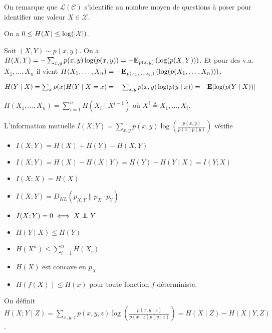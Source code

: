 On remarque que $\mathcal{L}(\mathcal{C})$ s'identifie au nombre moyen de questions à poser pour identifier une valeur $X \in \mathcal{X}$.

\begin{thm}
	On a $0 \leq H(X) \leq \log( \left\lvert\mathcal{X}\right\rvert )$.
\end{thm}

\begin{defn}
	Soit $(X,Y) \sim p(x,y)$.
	On a $H(X,Y) = - \sum_{x,y} p(x,y) \log(p(x,y)) = - \mathbf{E}_{p(x,y)} \left( \log (p(X,Y)) \right)$.
	Et pour des v.a. $X_1, \ldots, X_n$ il vient $H(X_1,\ldots,X_n) = - \mathbf{E}_{p(x_1,\ldots,x_n)} \left( \log( p(X_1,\ldots,X_n)) \right)$.
\end{defn}

\begin{defn}
	$H(Y \mid X)
		= \sum_x p(x) H(Y \mid X = x)
		= - \sum_{x,y} p(x,y) \log(p(y \mid x))
		= - \mathbf{E} [ \log(p(Y \mid X)) ]$
\end{defn}

\begin{thm}
	$H(X_1,\ldots,X_n) = \sum_{i = 1}^n H(X_i \mid X^{i - 1})$ où $X^i \triangleq X_1,\ldots,X_i$.
\end{thm}

\begin{pop}
	L'information mutuelle $I(X;Y) = \sum_{x,y} p(x,y) \log \left( \frac{p(x,y)}{p(x)p(y)} \right)$ vérifie
	\begin{itemize}
		\item[\textbullet] $I(X;Y) = H(X) + H(Y) - H(X,Y)$
		\item[\textbullet] $I(X;Y) = H(X) - H(X \mid Y) = H(Y) - H(Y \mid X) = I(Y;X)$
		\item[\textbullet] $I(X;X) = H(X)$
		\item[\textbullet] $I(X;Y) = D_{KL}( p_{X,Y} \| p_X \cdot p_Y )$
		\item[\textbullet] $I(X;Y) = 0 \iff X \indep Y$
		\item[\textbullet] $H(Y \mid X) \leq H(Y)$
		\item[\textbullet] $H(X^n) \leq \sum_{i = 1}^n H(X_i)$
		\item[\textbullet] $H(X)$ est concave en $p_X$
		\item[\textbullet] $H(f(X)) \leq H(x)$ pour toute fonction $f$ déterministe.
	\end{itemize}
\end{pop}

\begin{defn}
	On définit $H(X ; Y \mid Z) = \sum_{x,y,z} p(x,y,z) \log \left( \frac{p(x,y \mid z)}{p(x \mid z) p(y \mid z)} \right) = H(X \mid Z) - H(X \mid Y, Z)$.
\end{defn}

